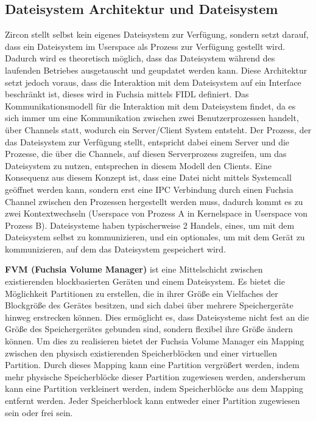 \documentclass[a4paper]{scrartcl}
\begin{document}
\subsection{Dateisystem Architektur und Dateisystem}
Zircon stellt selbst kein eigenes Dateisystem zur Verfügung, sondern setzt darauf, dass ein Dateisystem im Userspace als Prozess zur Verfügung gestellt wird. Dadurch wird es theoretisch möglich, dass das Dateisystem während des laufenden Betriebes ausgetauscht und geupdatet werden kann. Diese Architektur setzt jedoch voraus, dass die Interaktion mit dem Dateisystem auf ein Interface beschränkt ist, dieses wird in Fuchsia mittels FIDL definiert. \cite{Fuchsia.FIDL.io}\cite{Fuchsia.FIDL.io2} Das Kommunikationsmodell für die Interaktion mit dem Dateisystem findet, da es sich immer um eine Kommunikation zwischen zwei Benutzerprozessen handelt, über Channels statt, wodurch ein Server/Client System entsteht. Der Prozess, der das Dateisystem zur Verfügung stellt, entspricht dabei einem Server und die Prozesse, die über die Channels, auf diesen Serverprozess zugreifen, um das Dateisystem zu nutzen, entsprechen in diesem Modell den Clients. Eine Konsequenz aus diesem Konzept ist, dass eine Datei nicht mittels Systemcall geöffnet werden kann, sondern erst eine IPC Verbindung durch einen Fuchsia Channel \cite{Fuchsia.Kernel.KernelObjects} zwischen den Prozessen hergestellt werden muss, dadurch kommt es zu zwei Kontextwechseln (Userspace von Prozess A in Kernelspace in Userspace von Prozess B). Dateisysteme haben typischerweise 2 Handels, eines, um mit dem Dateisystem selbst zu kommunizieren, und ein optionales, um mit dem Gerät zu kommunizieren, auf dem das Dateisystem gespeichert wird. \cite{Fuchsia.Storage}

\textbf{FVM (Fuchsia Volume Manager)} ist eine Mittelschicht zwischen existierenden blockbasierten Geräten und einem Dateisystem. Es bietet die Möglichkeit Partitionen zu erstellen, die in ihrer Größe ein Vielfaches der Blockgröße des Gerätes besitzen, und sich dabei über mehrere Speichergeräte hinweg erstrecken können. Dies ermöglicht es, dass Dateisysteme nicht fest an die Größe des Speichergerätes gebunden sind, sondern flexibel ihre Größe ändern können. Um dies zu realisieren bietet der Fuchsia Volume Manager ein Mapping zwischen den physisch existierenden Speicherblöcken und einer virtuellen Partition. Durch dieses Mapping kann eine Partition vergrößert werden, indem mehr physische Speicherblöcke dieser Partition zugewiesen werden, andersherum kann eine Partition verkleinert werden, indem Speicherblöcke aus dem Mapping entfernt werden. Jeder Speicherblock kann entweder einer Partition zugewiesen sein oder frei sein.\cite{Fuchsia.Storage}
\end{document}
